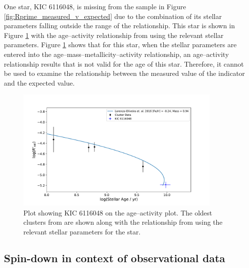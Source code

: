 One star, KIC 6116048, is missing from the sample in Figure \ref{fig:Rprime_measured_v_expected} due to the combination of its stellar parameters falling outside the range of the \citet{Lorenzo_Oliveira_etal_2016} relationship. This star is shown in Figure \ref{fig:LO_invalid_star} with the age--activity relationship from \citet{Lorenzo_Oliveira_etal_2016} using the relevant stellar parameters. Figure \ref{fig:LO_invalid_star} shows that for this star, when the stellar parameters are entered into the age--mass--metallicity--activity relationship, an age--activity relationship results that is not valid for the age of this star. Therefore, it cannot be used to examine the relationship between the measured value of the \Rprime indicator and the expected value.

\begin{figure}
	\centering
    \includegraphics[width=0.9\textwidth]{Figures/4-Chromospheric_age/rhk_KIC_6116048.pdf}
    \caption[Plot of age--activity relationship for stellar parameters of KIC 6116048]{Plot showing KIC 6116048 on the age--activity plot. The oldest clusters from \citet{Mamajek_Hillenbrand_2008} are shown along with the relationship from \citet{Lorenzo_Oliveira_etal_2016} using the relevant stellar parameters for the star.}
	\label{fig:LO_invalid_star}
\end{figure}

\subsection{Spin-down in context of observational data}
\label{Chp4_discus_spindown_context}

